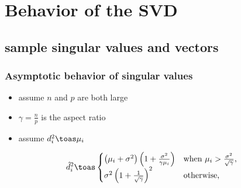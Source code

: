 \documentclass{beamer}
\begin{document}


\section{Behavior of the SVD}

\subsection{sample singular values and vectors}

\begin{frame}
  \frametitle{Asymptotic behavior of singular values}
  \begin{itemize}
  \item assume $n$ and $p$ are both large
  \item $\gamma = \frac{n}{p}$ is the aspect ratio
  \item assume $d_i^2 \toas \mu_i$
  \end{itemize} 
  \begin{theorem}
    \[
      \hat d_i^2
      \toas
        \begin{cases}
            \left( \mu_i + \sigma^2 \right)
            \left( 1 + \frac{\sigma^2}{\gamma \mu_i} \right)
                &\text{when $\mu_i > \frac{\sigma^2}{\sqrt{\gamma}}$}, \\
            \sigma^2 \left( 1 + \frac{1}{\sqrt{\gamma}} \right)^2
                &\text{otherwise,}
        \end{cases}
    \]
  \end{theorem} 
\end{frame}
\end{document}
